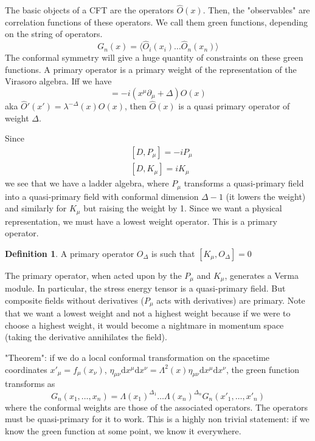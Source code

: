 \documentclass[a4paper]{book}
\theoremstyle{definition}
\newtheorem{definition}{Definition}[section]
\theoremstyle{remark}
\begin{document}
The basic objects of a CFT are the operators $\hat{O}(x)$. Then, the "observables" are correlation functions of these operators. We call them green functions, depending on the string of operators. 
\begin{equation}
    G_n(x) = \langle \hat{O}_i(x_i) \dots  \hat{O}_n(x_n)\rangle
\end{equation}
The conformal symmetry will give a huge quantity of constraints on these green functions. A primary operator is a primary weight of the representation of the Virasoro algebra. Iff we have 
\begin{equation}
    [\hat{D}, \hat{O}(x)] = -i(x^\mu \partial_\mu + \Delta) O(x)
\end{equation}
aka $\hat{O}'(x') = \lambda^{-\Delta}(x) O (x)$, then $\hat O(x)$ is a quasi primary operator of weight $\Delta$. \par \medskip 
Since 
\begin{equation}
    \begin{aligned}
        &[D, P_{\mu}] = -iP_\mu \\
        &[D, K_\mu] = iK_\mu
    \end{aligned}
\end{equation}
we see that we have a ladder algebra, where $P_\mu$ transforms a quasi-primary field into a quasi-primary field with conformal dimension $\Delta -1$ (it lowers the weight) and similarly for $K_\mu$ but raising the weight by 1. Since we want a physical representation, we must have a lowest weight operator. This is a primary operator. 
\begin{definition}
    A primary operator $O_{\Delta}$ is such that $[K_\mu, O_{\Delta}] = 0$
\end{definition}
The primary operator, when acted upon by the $P_\mu$ and $K_\mu$, generates a Verma module. In particular, the stress energy tensor is a quasi-primary field. But composite fields without derivatives ($P_\mu$ acts with derivatives) are primary. Note that we want a lowest weight and not a highest weight because if we were to choose a highest weight, it would become a nightmare in momentum space (taking the derivative annihilates the field). \par \medskip 

"Theorem": if we do a local conformal transformation on the spacetime coordinates $x'_\mu = f_\mu (x_\nu)$, $\eta_{\mu\nu} \text{d} x^\mu \text{d} x^\nu = \Lambda^2(x) \eta_{\mu\nu} \text{d} x^\mu \text{d} x^\nu$, the green function transforms as 
\begin{equation}
    G_n(x_1, \dots, x_n) = \Lambda(x_1)^{\Delta_1}\dots \Lambda(x_n)^{\Delta_n} G_n(x'_1, \dots, x'_n)
\end{equation}
where the conformal weights are those of the associated operators. The operators must be quasi-primary for it to work. This is a highly non trivial statement: if we know the green function at some point, we know it everywhere. \par \medskip
\end{document}

